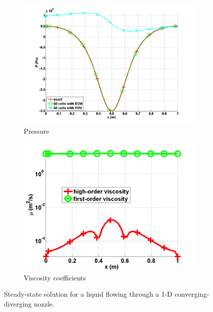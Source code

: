 \begin{figure}[H]
        \begin{subfigure}[b]{0.495\textwidth}
                \centering
                \includegraphics[width=\textwidth]{figures/liquid_pressure_numerical_and_exact_50.png}
                \caption{Pressure}
                \label{fig:1d_nozzle_liq_press}
        \end{subfigure}
        \begin{subfigure}[b]{0.495\textwidth}
                \centering
                \includegraphics[width=\textwidth]{figures/liquid_viscosity_numerical50.png}
                \caption{Viscosity coefficients}
                \label{fig:1d_nozzle_liq_visc}
        \end{subfigure}
        \caption{Steady-state solution for a liquid flowing through a 1-D converging-diverging nozzle.}\label{fig:1d_liq_nozzle}
\end{figure}
